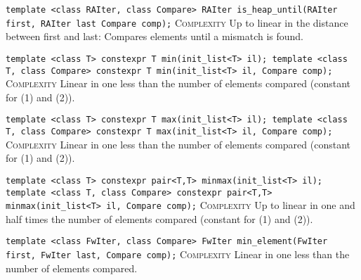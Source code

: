 \noindent{}\hspace*{0.25em}\lstinline[basicstyle=\ttfamily\color{corange}]{template <class RAIter, class Compare> RAIter is_heap_until(RAIter first, RAIter last Compare comp);} \textsc{Complexity} Up to linear in the distance between first and last: Compares elements until a mismatch is found.\\\vspace{-0.6em}

\noindent{}\hspace*{0.25em}\lstinline[basicstyle=\ttfamily\color{corange}]{template <class T> constexpr T min(init_list<T> il); template <class T, class Compare> constexpr T min(init_list<T> il, Compare comp);} \textsc{Complexity} Linear in one less than the number of elements compared (constant for (1) and (2)).\\\vspace{-0.6em}

\noindent{}\hspace*{0.25em}\lstinline[basicstyle=\ttfamily\color{corange}]{template <class T> constexpr T max(init_list<T> il); template <class T, class Compare> constexpr T max(init_list<T> il, Compare comp);} \textsc{Complexity} Linear in one less than the number of elements compared (constant for (1) and (2)).\\\vspace{-0.6em}

\noindent{}\hspace*{0.25em}\lstinline[basicstyle=\ttfamily\color{corange}]{template <class T> constexpr pair<T,T> minmax(init_list<T> il); template <class T, class Compare> constexpr pair<T,T> minmax(init_list<T> il, Compare comp);} \textsc{Complexity} Up to linear in one and half times the number of elements compared (constant for (1) and (2)).\\\vspace{-0.6em}

\noindent{}\hspace*{0.25em}\lstinline[basicstyle=\ttfamily\color{corange}]{template <class FwIter, class Compare> FwIter min_element(FwIter first, FwIter last, Compare comp);} \textsc{Complexity} Linear in one less than the number of elements compared.\\\vspace{-0.6em}

